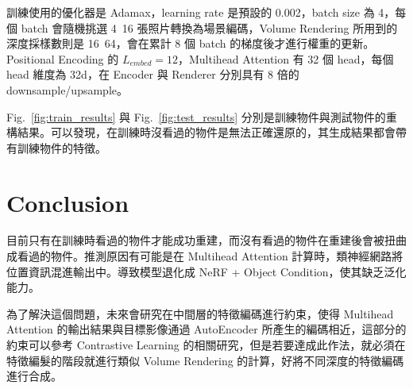 \documentclass[10pt,twocolumn,letterpaper]{article}
\begin{document}
\begin{CJK}{UTF8}{bkai}
   訓練使用的優化器是 Adamax，learning rate 是預設的 0.002，batch size 為 4，每個 batch 會隨機挑選 4~16
   張照片轉換為場景編碼，Volume Rendering 所用到的深度採樣數則是 16~64，會在累計 8 個 batch 的梯度後才進行權重的更新。Positional Encoding 的
   $L_{embed}=12$，Multihead Attention 有 32 個 head，每個 head 維度為 32d，在 Encoder 與 Renderer 分別具有 8 倍的 downsample/upsample。

   Fig.~\ref{fig:train_results} 與 Fig.~\ref{fig:test_results}
   分別是訓練物件與測試物件的重構結果。可以發現，在訓練時沒看過的物件是無法正確還原的，其生成結果都會帶有訓練物件的特徵。

   \section{Conclusion}
   目前只有在訓練時看過的物件才能成功重建，而沒有看過的物件在重建後會被扭曲成看過的物件。推測原因有可能是在
   Multihead Attention 計算時，類神經網路將位置資訊混進輸出中。導致模型退化成 NeRF + Object Condition，使其缺乏泛化能力。

   為了解決這個問題，未來會研究在中間層的特徵編碼進行約束，使得 Multihead Attention 的輸出結果與目標影像通過 AutoEncoder
   所產生的編碼相近，這部分的約束可以參考 Contrastive Learning 的相關研究，但是若要達成此作法，就必須在特徵編髮的階段就進行類似
   Volume Rendering 的計算，好將不同深度的特徵編碼進行合成。

   {\small
   
   
   }



\end{CJK}
\end{document}
